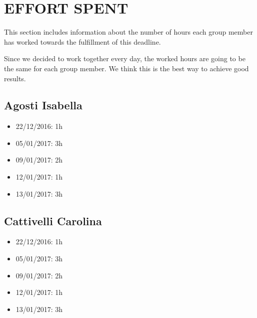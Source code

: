 \section{EFFORT SPENT}
This section includes information about the number of hours each group member has worked towards the fulfillment of this deadline. 

Since we decided to work together every day, the worked hours are going to be the same for each group member. We think this is the best way to achieve good results.  

\subsection{Agosti Isabella}
\begin{itemize}
	\item 22/12/2016: 1h
	\item 05/01/2017: 3h
	\item 09/01/2017: 2h
	\item 12/01/2017: 1h
	\item 13/01/2017: 3h
\end{itemize}
\subsection{Cattivelli Carolina}
\begin{itemize}
	\item 22/12/2016: 1h
	\item 05/01/2017: 3h
	\item 09/01/2017: 2h
	\item 12/01/2017: 1h
	\item 13/01/2017: 3h
\end{itemize}